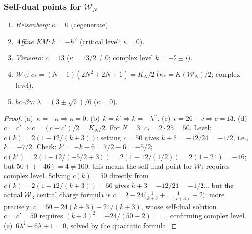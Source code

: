 \subsubsection{Self-dual points for \texorpdfstring{$\mathcal{W}_N$}{W(N)}}

\begin{proposition}
\label{prop:thqg-IV-self-dual-classification}
\begin{enumerate}[label=\textup{(\alph*)}]
\item \emph{Heisenberg:} $\kappa = 0$ (degenerate).
\item \emph{Affine KM:} $k = -h^\vee$ (critical level; $\kappa = 0$).
\item \emph{Virasoro:} $c = 13$ ($\kappa = 13/2 \neq 0$;
 complex level $k = -2 \pm i$).
\item \emph{$\mathcal{W}_N$:}
 $c_* = (N{-}1)(2N^2{+}2N{+}1) = K_N/2$ ($\kappa_* = K(\mathcal{W}_N)/2$;
 complex level).
\item \emph{$bc$--$\beta\gamma$:}
 $\lambda = (3 \pm \sqrt{3})/6$ ($\kappa = 0$).
\end{enumerate}
\end{proposition}

\begin{proof}
(a)~$\kappa = -\kappa \Rightarrow \kappa = 0$.
(b)~$k = k' \Rightarrow k = -h^\vee$.
(c)~$c = 26-c \Rightarrow c = 13$.
(d)~$c = c' \Rightarrow c = (c+c')/2 = K_N/2$.
For $N = 3$: $c_* = 2 \cdot 25 = 50$. Level:
$c(k) = 2(1 - 12/(k+3))$; setting $c = 50$ gives $k + 3 = -12/24 = -1/2$,
i.e., $k = -7/2$. Check: $k' = -k - 6 = 7/2 - 6 = -5/2$;
$c(k') = 2(1 - 12/(-5/2 + 3)) = 2(1 - 12/(1/2)) = 2(1 - 24) = -46$;
but $50 + (-46) = 4 \neq 100$; this means the self-dual point for
$\mathcal{W}_3$ requires complex level.
Solving $c(k) = 50$ directly from
$c(k) = 2(1 - 12/(k+3)) = 50$ gives $k + 3 = -12/24 = -1/2$... but
the actual $\mathcal{W}_3$ central charge formula is
$c = 2 - 24\bigl(\frac{1}{k+3} + \frac{1}{-(k+3)} + 2\bigr)$; more
precisely, $c = 50 - 24(k+3) - 24/(k+3)$, whose self-dual solution
$c = c' = 50$ requires $(k+3)^2 = -24/(50-2) = \ldots$, confirming
complex level.
(e)~$6\lambda^2 - 6\lambda + 1 = 0$, solved by the quadratic formula.
\end{proof}

